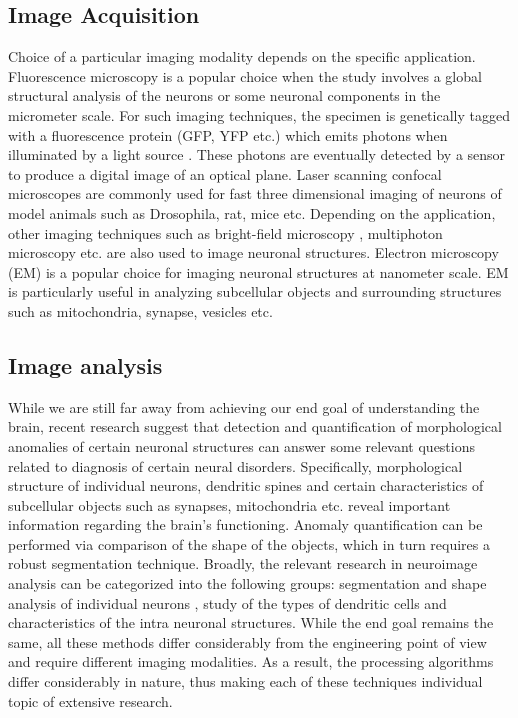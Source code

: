 \subsection{Image Acquisition}
Choice of a particular imaging modality depends on the specific application. Fluorescence microscopy is a popular choice when the study involves a global structural analysis of the neurons or some neuronal components in the micrometer scale. For such imaging techniques, the specimen is genetically tagged with a fluorescence protein (GFP, YFP etc.) which emits photons when illuminated by a light source \cite{barry_branching}. These photons are eventually detected by a sensor to produce a digital image of an optical plane. Laser scanning confocal microscopes are commonly used for fast three dimensional imaging of neurons of model animals such as Drosophila, rat, mice etc. Depending on the application, other imaging techniques such as bright-field microscopy \cite{oberlaender2007transmitted}, multiphoton microscopy \cite{santamaria2007automatic} etc. are also used to image neuronal structures.   Electron microscopy (EM) is a popular choice for imaging neuronal structures at nanometer scale. EM is particularly useful in analyzing subcellular objects and surrounding structures such as mitochondria, synapse, vesicles etc. 

\subsection{Image analysis}
While we are still far away from achieving our end goal of understanding the brain, recent research suggest that detection and quantification of morphological anomalies of certain neuronal structures can answer some relevant questions related to diagnosis of certain neural disorders. Specifically, morphological structure of individual neurons, dendritic spines and certain characteristics of subcellular objects such as synapses, mitochondria etc. reveal important information regarding the brain’s functioning. Anomaly quantification can be performed via comparison of the shape of the objects, which in turn requires a robust segmentation technique. Broadly, the relevant research in neuroimage analysis can be categorized into the following groups: segmentation and shape analysis of individual neurons \cite{dima_wavalet,mukherjee_T2T_2,mukherjee_TuFF,rodriguez_voxelscoop,peng_GAD}, study of the types of dendritic cells and characteristics of the intra neuronal structures\cite{5613939,6008641,6971126,EMmembrane_nguyen}. While the end goal remains the same, all these methods differ considerably from the engineering point of view and require different imaging modalities. As a result, the processing algorithms differ considerably in nature, thus making each of these techniques individual topic of extensive research.

